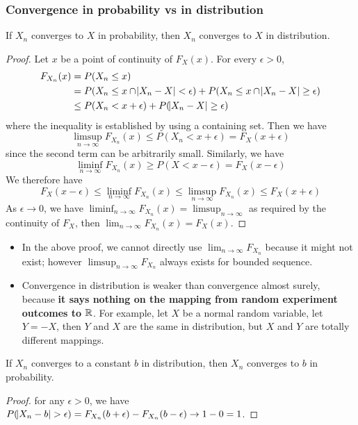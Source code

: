 \begin{refsection}
\subsubsection{Convergence in probability vs in distribution}
\begin{theorem}\cite[304]{hoggintroduction}\cite[311]{grimmett2001probability}
If $X_n$ converges to $X$ in probability, then $X_n$ converges to $X$ in distribution. 
\end{theorem}
\begin{proof}
Let $x$ be a point of continuity of $F_X(x)$. For every $\epsilon > 0$, 
\begin{align*}
F_{X_n}(x) &= P(X_n \leq x) \\
&= P(X_n \leq x \cap \abs{X_n-X} < \epsilon) + P(X_n \leq x \cap \abs{X_n-X} \geq \epsilon) \\
&\leq P(X_n < x + \epsilon) + P(\abs{X_n-X} \geq \epsilon)
\end{align*}
where the inequality is established by using a containing set.
Then we have $$\limsup_{n\to\infty} F_{X_n}(x) \leq P(X_n < x + \epsilon) = F_X(x+\epsilon)$$ since the second term can be arbitrarily small. Similarly, we have $$\liminf_{n\to\infty} F_{X_n}(x) \geq P(X < x - \epsilon) = F_X(x-\epsilon)$$
We therefore have
$$F_X(x-\epsilon) \leq \liminf_{n\to\infty} F_{X_n}(x) \leq \limsup_{n\to\infty} F_{X_n}(x) \leq F_X(x+\epsilon)$$
As $\epsilon \to 0$, we have $\liminf_{n\to\infty} F_{X_n}(x) = \limsup_{n\to\infty}$
as required by the continuity of $F_X$, then $\lim_{n\to\infty} F_{X_n}(x) = F_X(x)$.	
\end{proof}


\begin{remark}\hfill
\begin{itemize}
    \item In the above proof, we cannot directly use $\lim_{n\to \infty} F_{X_n}$ because it might not exist; however $\limsup_{n\to \infty} F_{X_n}$ always exists for bounded sequence.
    \item Convergence in distribution is weaker than convergence almost surely, because \textbf{it says nothing on the mapping from random experiment outcomes to $\mathbb{R}$}. For example, let $X$ be a normal random variable, let $Y=-X$, then $Y$ and $X$ are the same in distribution, but $X$ and $Y$ are totally different mappings.
\end{itemize}
\end{remark}


\begin{theorem}
\cite[305]{hoggintroduction}If $X_n$ converges to a constant $b$ in distribution, then $X_n$ converges to $b$ in probability.
\end{theorem}
\begin{proof}
	for any $\epsilon > 0$, we have $P(\abs{X_n-b}>\epsilon) = F_{X_n}(b+\epsilon) - F_{X_n}(b-\epsilon) \to 1 - 0 =1$.
\end{proof}
 




\end{refsection}
